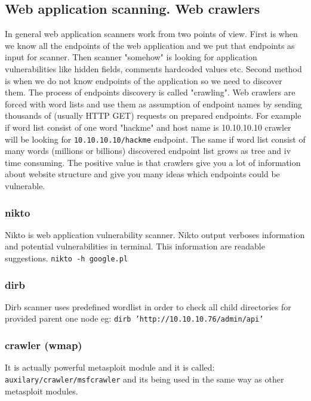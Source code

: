 \documentclass{article}[12pt]
\begin{document}

\subsection{Web application scanning. Web crawlers}
\label{subsec:webscanning}

In general web application scanners work from two points of view.
First is when we know all the endpoints of the web application and we put that endpoints as input for scanner.
Then scanner "somehow" is looking for application vulnerabilities like hidden fields, comments hardcoded values etc.
Second method is when we do not know endpoints of the application so we need to discover them.
The process of endpoints discovery is called "crawling".
Web crawlers are forced with word lists and use them as assumption of endpoint names by sending thousands of (usually HTTP GET) requests on prepared endpoints.
For example if word list consist of one word "hackme" and host name is 10.10.10.10 crawler will be looking for \texttt{10.10.10.10/hackme} endpoint.
The same if word list consist of many words (millions or billions) discovered endpoint list grows as tree and iv time consuming.
The positive value is that crawlers give you a lot of information about website structure and give you many ideas which endpoints could be vulnerable.
\subsubsection{nikto}
Nikto is web application vulnerability scanner.
Nikto output verboses information and potential vulnerabilities in terminal.
This information are readable suggestions.
\newline
\texttt{nikto -h google.pl}

\subsubsection{dirb}

Dirb scanner uses predefined wordlist in order to check all child directories for provided parent one node eg:
\newline
\texttt*{dirb 'http://10.10.10.76/admin/api'}

\subsubsection{crawler (wmap)}
It is actually powerful metasploit module and it is called: \texttt{auxilary/crawler/msfcrawler} and its being used in the same way as other metasploit modules.
\end{document}
